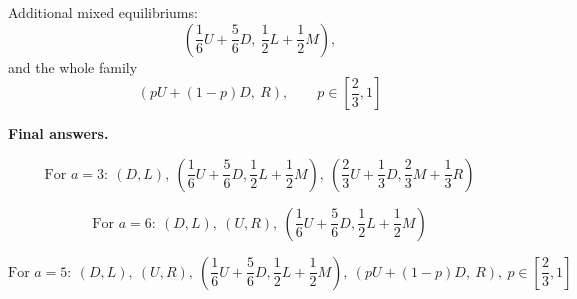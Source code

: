 Additional mixed equilibriums:
\[
\left(\frac16 U+\frac56 D,\ \frac12 L+\frac12 M\right),
\]
and the whole family
\[
\left(pU+(1-p)D,\ R\right),
\qquad
p\in\left[\frac23,1\right]
\]

\textbf{Final answers.}

\[
\text{For }a=3: \ (D,L),\ \left(\frac16 U+\frac56 D,\frac12 L+\frac12 M\right),\ \left(\frac23 U+\frac13 D,\frac23 M+\frac13 R\right)
\]

\[
\text{For }a=6: \ (D,L),\ (U,R),\ \left(\frac16 U+\frac56 D,\frac12 L+\frac12 M\right)
\]

\[
\text{For }a=5: \ (D,L),\ (U,R),\ \left(\frac16 U+\frac56 D,\frac12 L+\frac12 M\right),\ \left(pU+(1-p)D,\ R\right),\ p\in\left[\frac23,1\right]
\]
